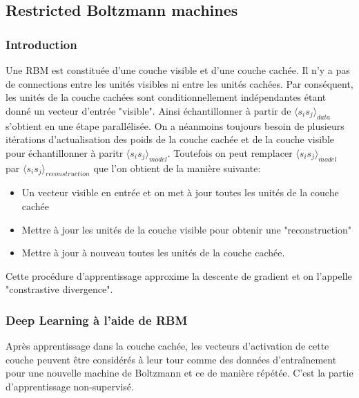 \documentclass{article}
\theoremstyle{definition}
\begin{document}
\subsection{Restricted Boltzmann machines}

\subsubsection{Introduction}

\noindent Une RBM est constituée d'une couche visible et d'une couche cachée. Il n'y a pas de connections entre les unités visibles ni entre les unités cachées. Par conséquent, les unités de la couche cachées sont conditionnellement indépendantes étant donné un vecteur d'entrée "visible". Ainsi échantillonner à partir de $\langle s_i s_j\rangle_{data}$ s'obtient en une étape parallélisée. On a néanmoins toujours besoin de plusieurs itérations d'actualisation des poids de la couche cachée et de la couche visible pour échantillonner à paritr $\langle s_i s_j\rangle_{model}$. Toutefois on peut remplacer $\langle s_i s_j\rangle_{model}$ par $\langle s_i s_j\rangle_{reconstruction}$ que l'on obtient de la manière suivante:\\
\begin{itemize}
\item Un vecteur visible en entrée et on met à jour toutes les unités de la couche cachée
\item Mettre à jour les unités de la couche visible pour obtenir une "reconstruction"
\item Mettre à jour à nouveau toutes les unités de la couche cachée.\\
\end{itemize}

\noindent Cette procédure d'apprentissage approxime la descente de gradient et on l'appelle "constrastive divergence".\\

\subsubsection{Deep Learning à l'aide de RBM}


\noindent Après apprentissage dans la couche cachée, les vecteurs d'activation de cette couche peuvent être considérés à leur tour comme des données d'entraînement pour une nouvelle machine de Boltzmann et ce de manière répétée. C'est la partie d'apprentissage non-supervisé.\\
\end{document}
